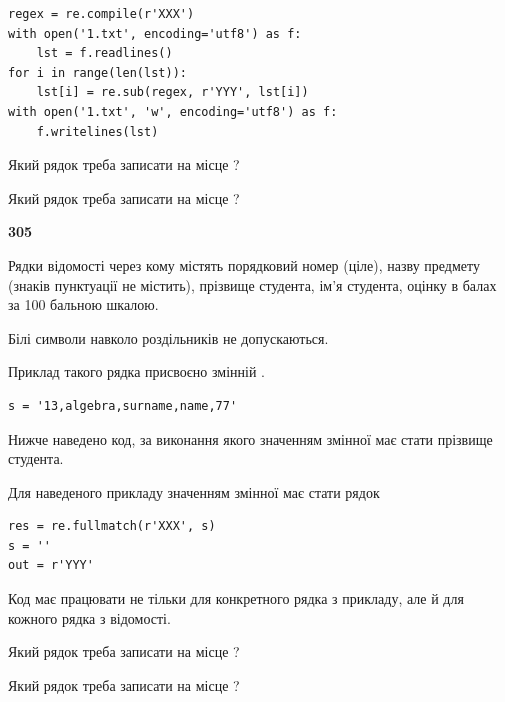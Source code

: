 \begin{verbatim}
regex = re.compile(r'XXX')
with open('1.txt', encoding='utf8') as f:
    lst = f.readlines()
for i in range(len(lst)):
    lst[i] = re.sub(regex, r'YYY', lst[i])
with open('1.txt', 'w', encoding='utf8') as f:
    f.writelines(lst)
\end{verbatim}







Який рядок треба записати на місце  ?\par
\vspace{5mm}


Який рядок треба записати на місце  ?\par


\newpage

{\begin {center}\textbf{ 305}\end {center}}\par
Рядки відомості через кому містять порядковий номер (ціле), назву предмету (зна\-ків пунктуації не містить), прізвище студента, ім'я студента, оцінку в балах за 100 бальною шкалою.

Білі символи навколо роздільників не допускаються.

Приклад такого рядка присвоєно змінній .



\begin{verbatim}
s = '13,algebra,surname,name,77'
\end{verbatim}


Нижче наведено код, за виконання якого значенням змінної  має стати прізвище студента.

Для наведеного прикладу значенням змінної  має стати рядок 



\begin{verbatim}
res = re.fullmatch(r'XXX', s)
s = ''
out = r'YYY'
\end{verbatim}


Код має працювати не тільки для конкретного рядка з прикладу, але й для кожного рядка з відомості.




Який рядок треба записати на місце  ?\par
\vspace{5mm}


Який рядок треба записати на місце  ?\par


